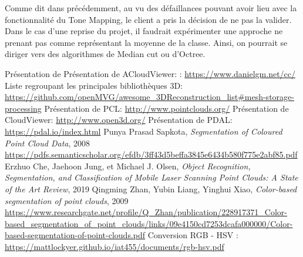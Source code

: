\documentclass[12pt,titlepage,french]{article}
\begin{document}
Comme dit dans précédemment, au vu des défaillances pouvant avoir lieu avec la fonctionnalité du Tone Mapping, le client a pris la décision de ne pas la valider. Dans le cas d'une reprise du projet, il faudrait expérimenter une approche ne prenant pas comme représentant la moyenne de la classe. Ainsi, on pourrait se diriger vers des algorithmes de Median cut ou d'Octree.

\newpage
\begin{thebibliography}{3}
	 Présentation de  Présentation de ACloudViewer:
: \url{https://www.danielgm.net/cc/}
	 Liste regroupant les principales bibliothèques 3D: \url{https://github.com/openMVG/awesome_3DReconstruction_list#mesh-storage-processing}
	 Présentation de PCL: \url{http://www.pointclouds.org/}
	 Présentation de CloudViewer: \url{http://www.open3d.org/}
	 Présentation de PDAL: \url{https://pdal.io/index.html}
	 Punya Prasad Sapkota, \textit{Segmentation of Coloured Point Cloud Data}, 2008 \url{https://pdfs.semanticscholar.org/efdb/3ff43d5beffa3845e6434b580f775e2abf85.pdf}
	 Erzhuo Che, Jaehoon Jung, et Michael J. Olsen, \textit{Object Recognition, Segmentation, and Classification of Mobile Laser Scanning Point Clouds: A State of the Art Review}, 2019
	 Qingming Zhan, Yubin Liang, Yinghui Xiao, \textit{Color-based segmentation of point clouds}, 2009 \url{https://www.researchgate.net/profile/Q_Zhan/publication/228917371_Color-based_segmentation_of_point_clouds/links/09e4150cd7253dcafa000000/Color-based-segmentation-of-point-clouds.pdf}
  	 Conversion RGB - HSV : \url{https://mattlockyer.github.io/iat455/documents/rgb-hsv.pdf}
\end{thebibliography}
\end{document}
